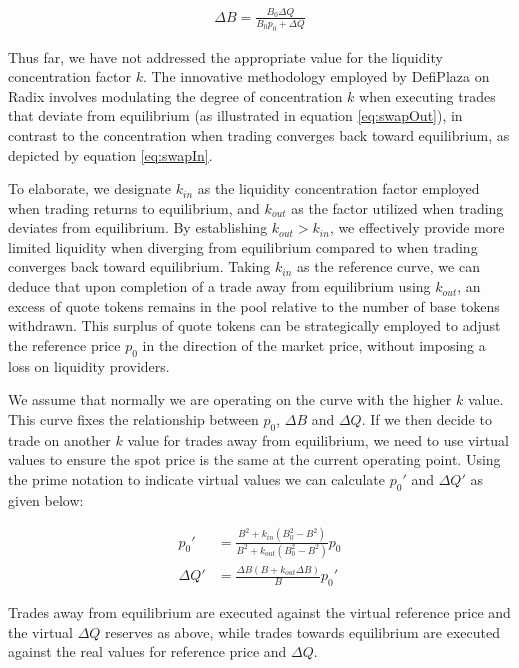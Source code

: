 \begin{align} \label{eq:swapOutSpecial}
  \Delta B = \frac{B_0 \Delta Q}{B_0 p_0 + \Delta Q}
\end{align}

Thus far, we have not addressed the appropriate value for the liquidity concentration factor $k$. The innovative methodology employed by DefiPlaza on Radix involves modulating the degree of concentration $k$ when executing trades that deviate from equilibrium (as illustrated in equation \ref{eq:swapOut}), in contrast to the concentration when trading converges back toward equilibrium, as depicted by equation \ref{eq:swapIn}.

To elaborate, we designate $k_{in}$ as the liquidity concentration factor employed when trading returns to equilibrium, and $k_{out}$ as the factor utilized when trading deviates from equilibrium. By establishing $k_{out} > k_{in}$, we effectively provide more limited liquidity when diverging from equilibrium compared to when trading converges back toward equilibrium. Taking $k_{in}$ as the reference curve, we can deduce that upon completion of a trade away from equilibrium using $k_{out}$, an excess of quote tokens remains in the pool relative to the number of base tokens withdrawn. This surplus of quote tokens can be strategically employed to adjust the reference price $p_0$ in the direction of the market price, without imposing a loss on liquidity providers.

We assume that normally we are operating on the curve with the higher $k$ value. This curve fixes the relationship between $p_0$, $\Delta B$ and $\Delta Q$. If we then decide to trade on another $k$ value for trades away from equilibrium, we need to use virtual values to ensure the spot price is the same at the current operating point. Using the prime notation to indicate virtual values we can calculate $p_0'$ and $\Delta Q'$ as given below:

\begin{align} \label{eq:PZeroPrime}
  p_0' &= \frac{B^2 + k_{in} \left( B_0^2 - B^2 \right)}{B^2 + k_{out} \left( B_0^2 -B^2 \right)} p_0 \\
  \Delta Q' &= \frac{\Delta B \left(B + k_{out} \Delta B \right)}{B} p_0'
\end{align}

Trades away from equilibrium are executed against the virtual reference price and the virtual $\Delta Q$ reserves as above, while trades towards equilibrium are executed against the real values for reference price and $\Delta Q$.

